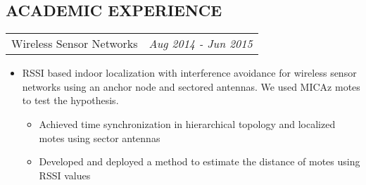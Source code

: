 \documentclass[margin]{res}
\begin{document}
\begin{resume}
\section{ACADEMIC EXPERIENCE}      
                  \begin{tabular}{p{4.2in} r}  %
                  Wireless Sensor Networks &  \textit{Aug 2014 - Jun 2015 }
                  \end{tabular}	
                   \begin{itemize} %
                    \item[] RSSI based indoor localization with interference avoidance for wireless sensor networks using an anchor node and sectored antennas. We used MICAz motes to test the hypothesis. 
                    \begin{itemize}
                   	 \item Achieved time synchronization in hierarchical topology and localized motes using sector antennas
                    \item Developed and deployed a method to estimate the distance of motes using RSSI values
                    \end{itemize}
		   \end{itemize} 
		   
                   
                  

\end{resume}
\end{document}
